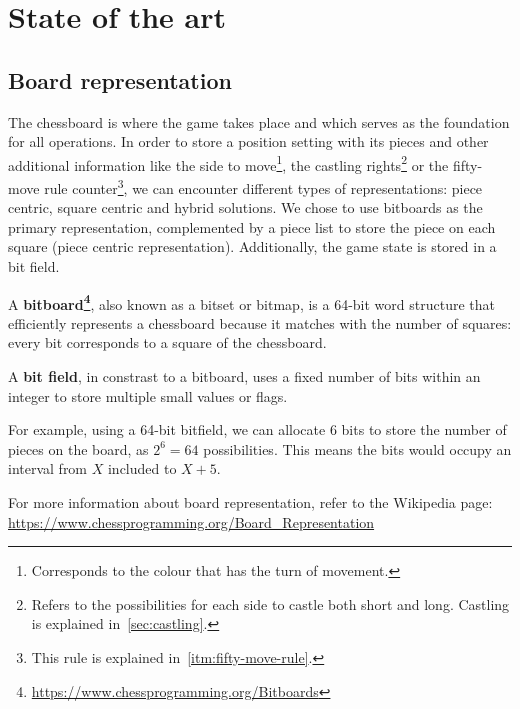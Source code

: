 \chapter{State of the art}
\label{cap:estadoDeLaCuestion}

\section{Board representation}

The chessboard is where the game takes place and which serves as the foundation for all operations. In order to store a position setting with its pieces and other additional information like the side to move\footnote{Corresponds to the colour that has the turn of movement.}, the castling rights\footnote{Refers to the possibilities for each side to castle both short and long. Castling is explained in~\ref{sec:castling}.} or the fifty-move rule counter\footnote{This rule is explained in~\ref{itm:fifty-move-rule}.}, we can encounter different types of representations: piece centric, square centric and hybrid solutions. We chose to use bitboards as the primary representation, complemented by a piece list to store the piece on each square (piece centric representation). Additionally, the game state is stored in a bit field.

\vspace{1em}

A \textbf{bitboard\footnote{\url{https://www.chessprogramming.org/Bitboards}}}, also known as a bitset or bitmap, is a 64-bit word structure that efficiently represents a chessboard because it matches with the number of squares: every bit corresponds to a square of the chessboard.

\vspace{1em}

A \textbf{bit field}, in constrast to a bitboard, uses a fixed number of bits within an integer to store multiple small values or flags.

\vspace{1em}

For example, using a 64-bit bitfield, we can allocate 6 bits to store the number of pieces on the board, as $2^6 = 64$ possibilities. This means the bits would occupy an interval from $X$ included to $X+5$.

\vspace{1em}

For more information about board representation, refer to the Wikipedia page: \url{https://www.chessprogramming.org/Board_Representation}

